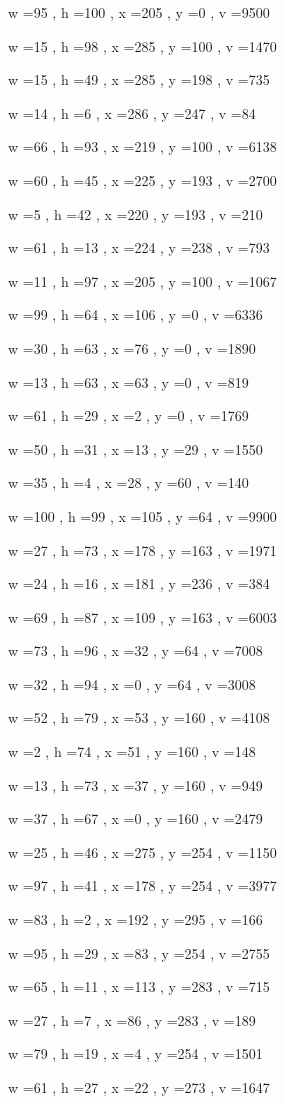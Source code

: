 \documentclass[11pt]{article}
\begin{document}
w =95 , h =100 , x =205 , y =0 , v =9500
\par
w =15 , h =98 , x =285 , y =100 , v =1470
\par
w =15 , h =49 , x =285 , y =198 , v =735
\par
w =14 , h =6 , x =286 , y =247 , v =84
\par
w =66 , h =93 , x =219 , y =100 , v =6138
\par
w =60 , h =45 , x =225 , y =193 , v =2700
\par
w =5 , h =42 , x =220 , y =193 , v =210
\par
w =61 , h =13 , x =224 , y =238 , v =793
\par
w =11 , h =97 , x =205 , y =100 , v =1067
\par
w =99 , h =64 , x =106 , y =0 , v =6336
\par
w =30 , h =63 , x =76 , y =0 , v =1890
\par
w =13 , h =63 , x =63 , y =0 , v =819
\par
w =61 , h =29 , x =2 , y =0 , v =1769
\par
w =50 , h =31 , x =13 , y =29 , v =1550
\par
w =35 , h =4 , x =28 , y =60 , v =140
\par
w =100 , h =99 , x =105 , y =64 , v =9900
\par
w =27 , h =73 , x =178 , y =163 , v =1971
\par
w =24 , h =16 , x =181 , y =236 , v =384
\par
w =69 , h =87 , x =109 , y =163 , v =6003
\par
w =73 , h =96 , x =32 , y =64 , v =7008
\par
w =32 , h =94 , x =0 , y =64 , v =3008
\par
w =52 , h =79 , x =53 , y =160 , v =4108
\par
w =2 , h =74 , x =51 , y =160 , v =148
\par
w =13 , h =73 , x =37 , y =160 , v =949
\par
w =37 , h =67 , x =0 , y =160 , v =2479
\par
w =25 , h =46 , x =275 , y =254 , v =1150
\par
w =97 , h =41 , x =178 , y =254 , v =3977
\par
w =83 , h =2 , x =192 , y =295 , v =166
\par
w =95 , h =29 , x =83 , y =254 , v =2755
\par
w =65 , h =11 , x =113 , y =283 , v =715
\par
w =27 , h =7 , x =86 , y =283 , v =189
\par
w =79 , h =19 , x =4 , y =254 , v =1501
\par
w =61 , h =27 , x =22 , y =273 , v =1647
\par
\newpage
\end{document}
